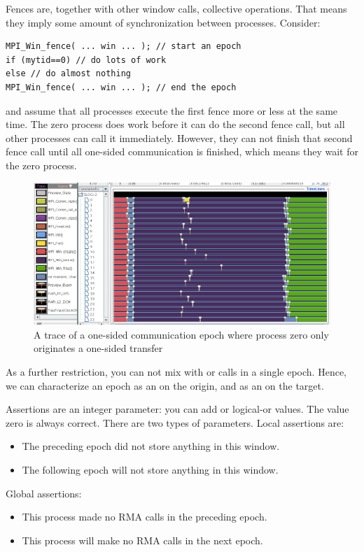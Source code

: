 Fences are, together with other window calls, collective operations. That means they 
imply some amount of synchronization between processes. Consider:
\begin{verbatim}
MPI_Win_fence( ... win ... ); // start an epoch
if (mytid==0) // do lots of work
else // do almost nothing
MPI_Win_fence( ... win ... ); // end the epoch
\end{verbatim}
and assume that all processes execute the first fence more or less at the same time.
The zero process does work before it can do the second fence call, but all other
processes can call it immediately. However, they can not finish that second fence call
until all one-sided communication is finished, which means they wait for the zero process.
\begin{figure}[ht]
  \includegraphics[scale=.4]{graphics/lonestar-twonode-put}%
  \caption{A trace of a one-sided communication epoch where process zero only originates
  a one-sided transfer}
  \label{fig:putblock}
\end{figure}

As a further restriction, you can not mix  with  or 
calls in a single epoch. Hence, we can characterize an epoch as an
 on the origin, and
as an  on the target.

Assertions are an integer parameter: you can add or logical-or values.
The value zero is always correct. There are two types of parameters.
Local assertions are:
\begin{itemize}
  \item{} The preceding epoch did not store
    anything in this window.
  \item{} The following epoch will not store
    anything in this window.
\end{itemize}
Global assertions:
\begin{itemize}
  \item{} This process made no \ac{RMA}
    calls in the preceding epoch.  
  \item{} This process will make no
    \ac{RMA} calls in the next epoch.
\end{itemize}


